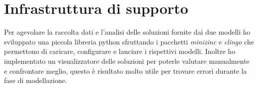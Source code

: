 
\section{Infrastruttura di supporto}
Per agevolare la raccolta dati e l'analisi delle soluzioni fornite dai due modelli ho sviluppato una piccola libreria python sfruttando i pacchetti \emph{minizinc} e \emph{clingo} che permettono di caricare, configurare e lanciare i rispettivi modelli.
Inoltre ho implementato un visualizzatore delle soluzioni per poterle valutare manualmente e confrontare meglio, questo è risultato molto utile per trovare errori durante la fase di modellazione.

